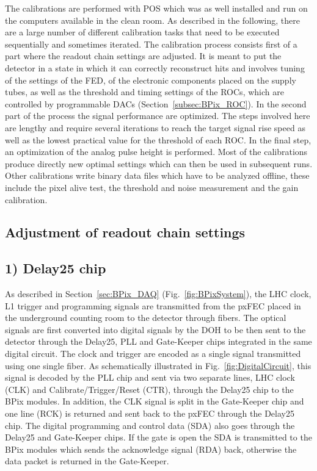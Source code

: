 The calibrations are performed with POS which was as well installed and run on the computers available in the clean room.
As described in the following, there are a large number of different calibration tasks that need to be executed sequentially and sometimes iterated.
The calibration process consists first of a part where the readout chain settings are adjusted. It is meant to put the detector in a state in which it can correctly reconstruct hits and involves tuning of the settings of the FED,
of the electronic components placed on the supply tubes, as well as the threshold and timing settings of the ROCs, which are controlled by programmable DACs (Section~\ref{subsec:BPix_ROC}).
In the second part of the process the signal performance are optimized. The steps involved here are lengthy and require several iterations to reach the target signal rise speed as well as the lowest practical value for the threshold of each ROC. In the final step, an optimization of the analog pulse height is performed.
Most of the calibrations produce directly new optimal settings which can then be used in subsequent runs.
Other calibrations write binary data files which have to be analyzed offline, these include the pixel alive test, the threshold and noise measurement and the gain calibration.

\subsection{Adjustment of readout chain settings}\label{subsec:calibPart1}

\subsection*{1) Delay25 chip}

As described in Section~\ref{sec:BPix_DAQ} (Fig.~\ref{fig:BPixSystem}), the LHC clock, L1 trigger and programming signals are transmitted from the pxFEC placed in the underground counting room to the detector through fibers.
The optical signals are first converted into digital signals by the DOH to be then sent to the detector through the Delay25, PLL and Gate-Keeper chips integrated in the same digital circuit.
The clock and trigger are encoded as a single signal transmitted using one single fiber.
As schematically illustrated in Fig.~\ref{fig:DigitalCircuit}, this signal is decoded by the PLL chip and sent via two separate lines, LHC clock (CLK) and Calibrate/Trigger/Reset (CTR), through the Delay25 chip to the BPix modules.
In addition, the CLK signal is split in the Gate-Keeper chip and one line (RCK) is returned and sent back to the pxFEC through the Delay25 chip.
The digital programming and control data (SDA) also goes through the Delay25 and Gate-Keeper chips.
If the gate is open the SDA is transmitted to the BPix modules which sends the acknowledge signal (RDA) back, otherwise the data packet is returned in the Gate-Keeper.

